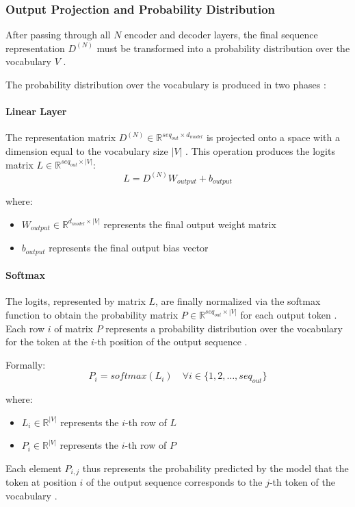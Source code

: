 \subsubsection{Output Projection and Probability Distribution}
After passing through all $N$ encoder and decoder layers, the final sequence representation $D^{(N)}$ must be transformed into a probability distribution over the vocabulary $V$ \cite{arxiv-attention, stanford}.

The probability distribution over the vocabulary is produced in two phases \cite{arxiv-attention}:



\paragraph{Linear Layer} The representation matrix $D^{(N)}\in \mathbb{R}^{seq_{out} \times d_{model}}$ is projected onto a space with a dimension equal to the vocabulary size $|V|$ \cite{arxiv-attention, git-hub}. This operation produces the logits matrix $L \in \mathbb{R}^{seq_{out} \times |V|}$:
\begin{equation}
L = D^{(N)} W_{output} + b_{output}
\end{equation}

where:
\begin{itemize}
\item $W_{output} \in \mathbb{R}^{d_{model} \times |V|}$ represents the final output weight matrix
\item $b_{output}$ represents the final output bias vector
\end{itemize}

\paragraph{Softmax} The logits, represented by matrix $L$, are finally normalized via the softmax function to obtain the probability matrix $P \in \mathbb{R}^{seq_{out}\times |V|}$ for each output token \cite{arxiv-attention, stanford}. Each row $i$ of matrix $P$ represents a probability distribution over the vocabulary for the token at the $i$-th position of the output sequence \cite{stanford, GeeksForGeeks}.

Formally:
\begin{equation}
P_i = softmax(L_i) \quad \forall i \in \{1,2,\dots,seq_{out}\}
\end{equation}

where:
\begin{itemize}
\item $L_i \in \mathbb{R}^{|V|}$ represents the $i$-th row of $L$
\item $P_{i} \in \mathbb{R}^{|V|}$ represents the $i$-th row of $P$
\end{itemize}
Each element $P_{i,j}$ thus represents the probability predicted by the model that the token at position $i$ of the output sequence corresponds to the $j$-th token of the vocabulary \cite{arxiv-attention, hashnode}.

